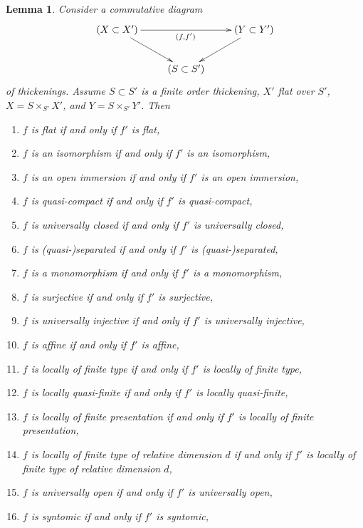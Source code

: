 \documentclass[10pt,a4paper]{amsart}
\theoremstyle{plain}
\newtheorem{lemma}[subsection]{Lemma}
\theoremstyle{definition}
\theoremstyle{remark}
\numberwithin{equation}{subsection}
\begin{document}
\begin{lemma}
\label{lemma-deform-property}
Consider a commutative diagram
$$
\xymatrix{
(X \subset X') \ar[rr]_{(f, f')} \ar[rd] & & (Y \subset Y') \ar[ld] \\
& (S \subset S')
}
$$
of thickenings. Assume $S \subset S'$ is a finite order thickening,
$X'$ flat over $S'$, $X = S \times_{S'} X'$, and
$Y = S \times_{S'} Y'$. Then
\begin{enumerate}
\item $f$ is flat if and only if $f'$ is flat,
\label{item-flat}
\item $f$ is an isomorphism if and only if $f'$ is an isomorphism,
\label{item-isomorphism}
\item $f$ is an open immersion if and only if $f'$ is an open immersion,
\label{item-open-immersion}
\item $f$ is quasi-compact if and only if $f'$ is quasi-compact,
\label{item-quasi-compact}
\item $f$ is universally closed if and only if $f'$ is universally closed,
\label{item-universally-closed}
\item $f$ is (quasi-)separated if and only if $f'$ is (quasi-)separated,
\label{item-separated}
\item $f$ is a monomorphism if and only if $f'$ is a monomorphism,
\label{item-monomorphism}
\item $f$ is surjective if and only if $f'$ is surjective,
\label{item-surjective}
\item $f$ is universally injective if and only if $f'$ is universally injective,
\label{item-universally-injective}
\item $f$ is affine if and only if $f'$ is affine,
\label{item-affine}
\item
\label{item-finite-type}
$f$ is locally of finite type if and only if $f'$ is locally of finite type,
\item $f$ is locally quasi-finite if and only if $f'$ is locally quasi-finite,
\label{item-quasi-finite}
\item
\label{item-finite-presentation}
$f$ is locally of finite presentation if and only if $f'$ is locally of
finite presentation,
\item
\label{item-relative-dimension-d}
$f$ is locally of finite type of relative dimension $d$ if and only if
$f'$ is locally of finite type of relative dimension $d$,
\item $f$ is universally open if and only if $f'$ is universally open,
\label{item-universally-open}
\item $f$ is syntomic if and only if $f'$ is syntomic,

\end{enumerate}
\end{lemma}
\end{document}
